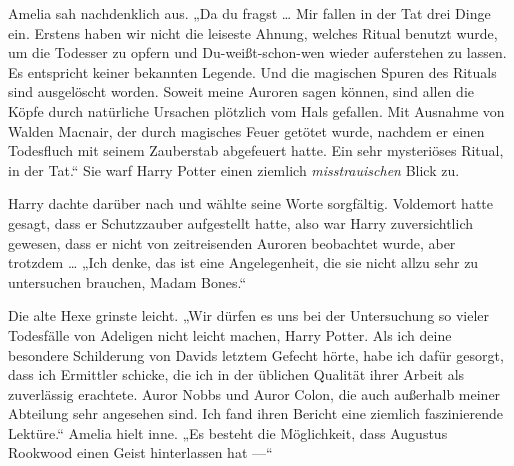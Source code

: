 Amelia sah nachdenklich aus.
„Da du fragst … Mir fallen in der Tat drei Dinge ein. Erstens haben wir nicht die leiseste Ahnung, welches Ritual benutzt wurde, um die Todesser zu opfern und Du-weißt-schon-wen wieder auferstehen zu lassen. Es entspricht keiner bekannten Legende. Und die magischen Spuren des Rituals sind ausgelöscht worden. Soweit meine Auroren sagen können, sind allen die Köpfe durch natürliche Ursachen plötzlich vom Hals gefallen. Mit Ausnahme von Walden Macnair, der durch magisches Feuer getötet wurde, nachdem er einen Todesfluch mit seinem Zauberstab abgefeuert hatte. Ein sehr mysteriöses Ritual, in der Tat.“
Sie warf Harry Potter einen ziemlich \emph{misstrauischen} Blick zu.

Harry dachte darüber nach und wählte seine Worte sorgfältig. Voldemort hatte gesagt, dass er Schutzzauber aufgestellt hatte, also war Harry zuversichtlich gewesen, dass er nicht von zeitreisenden Auroren beobachtet wurde, aber trotzdem …
„Ich denke, das ist eine Angelegenheit, die sie nicht allzu sehr zu untersuchen brauchen, Madam Bones.“

Die alte Hexe grinste leicht.
„Wir dürfen es uns bei der Untersuchung so vieler Todesfälle von Adeligen nicht leicht machen, Harry Potter. Als ich deine besondere Schilderung von Davids letztem Gefecht hörte, habe ich dafür gesorgt, dass ich Ermittler schicke, die ich in der üblichen Qualität ihrer Arbeit als zuverlässig erachtete. Auror Nobbs und Auror Colon, die auch außerhalb meiner Abteilung sehr angesehen sind. Ich fand ihren Bericht eine ziemlich faszinierende Lektüre.“
Amelia hielt inne.
„Es besteht die Möglichkeit, dass Augustus Rookwood einen Geist hinterlassen hat —“


